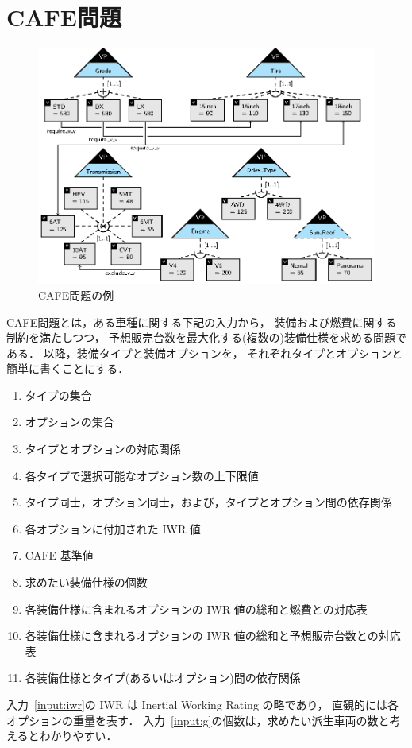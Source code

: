 \section{CAFE問題}\label{sec:background}

\begin{figure}[t]
  \centering
  \includegraphics[width=0.8\linewidth]{images/ovm_example.eps}
  \caption{CAFE問題の例}
  \label{fig:ovm_example}
\end{figure}

CAFE問題とは，ある車種に関する下記の入力から，
装備および燃費に関する制約を満たしつつ，
予想販売台数を最大化する(複数の)装備仕様を求める問題である．
以降，装備タイプと装備オプションを，
それぞれタイプとオプションと簡単に書くことにする．
\begin{enumerate}
\item タイプの集合\label{input:vp}
\item オプションの集合\label{input:v}
\item タイプとオプションの対応関係\label{input:vp-v}
\item 各タイプで選択可能なオプション数の上下限値\label{input:ublb}
\item タイプ同士，オプション同士，および，タイプとオプション間の依存関係
  \label{input:dependency}
\item 各オプションに付加された IWR 値\label{input:iwr}
\item CAFE 基準値\label{input:cafe}
\item 求めたい装備仕様の個数\label{input:g}
\item 各装備仕様に含まれるオプションの IWR 値の総和と燃費との対応表\label{input:fe}
\item 各装備仕様に含まれるオプションの IWR 値の総和と予想販売台数との対応表\label{input:sv}
\item 各装備仕様とタイプ(あるいはオプション)間の依存関係\label{input:init}
\end{enumerate}
入力~\ref{input:iwr}の IWR は Inertial Working Rating の略であり，
直観的には各オプションの重量を表す．
入力~\ref{input:g}の個数は，求めたい派生車両の数と考えるとわかりやすい．

